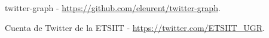 
\begin{thebibliography}{9}


	twitter-graph - \url{https://github.com/eleurent/twitter-graph}.


	Cuenta de Twitter de la ETSIIT - \url{https://twitter.com/ETSIIT_UGR}.

\end{thebibliography}
